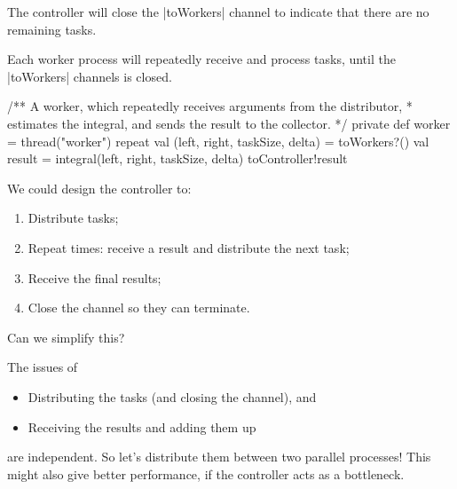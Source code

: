 
\begin{slide}

The controller will close the |toWorkers| channel to indicate that there are
no remaining tasks.

Each  worker process will repeatedly receive and process tasks, until the
|toWorkers|  channels is closed.  
%
\begin{scala}
  /** A worker, which repeatedly receives arguments from the distributor,
    * estimates the integral, and sends the result to the collector. */
  private def worker = thread("worker"){
    repeat{
      val (left, right, taskSize, delta) = toWorkers?() 
      val result = integral(left, right, taskSize, delta)
      toController!result
    }
  }
\end{scala}
\end{slide}


\begin{slide}

We could design the controller to:
%
\begin{enumerate}
\item
Distribute  tasks;

\item
Repeat  times: receive a result and distribute the next
task;

\item
Receive the final  results;

\item
Close the  channel so they can terminate.
\end{enumerate}

Can we simplify this?

\end{slide}


\begin{slide}

The issues of 
%
\begin{itemize}
\item
Distributing the tasks (and closing the  channel), and

\item
Receiving the results and adding them up
\end{itemize}
%
are independent.  So let's distribute them between two parallel processes!
This might also give better performance, if the controller acts as a
bottleneck.  
\end{slide}

